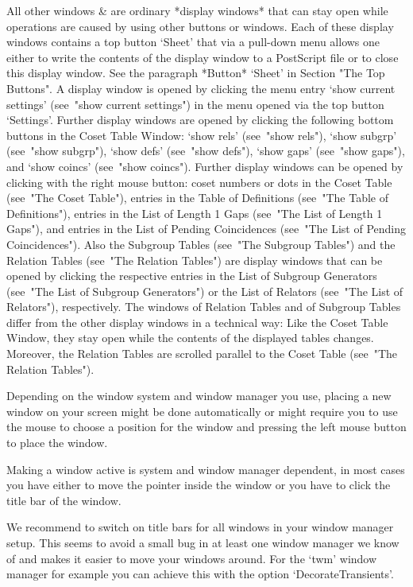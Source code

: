All other windows &
  are ordinary *display windows* that can stay open while operations
  are caused by using other buttons or windows. Each of these display
  windows contains a top button `Sheet' that via a pull-down menu
  allows one either to write the contents of the display window to a
  PostScript file or to close this display window. See the paragraph
  *Button* `Sheet' in Section "The Top Buttons".
  A display window is opened by clicking the menu entry
  `show current settings' (see~"show current settings") in the menu
  opened via the top button `Settings'. Further display windows are
  opened by clicking the following bottom buttons in the Coset Table
  Window: `show rels' (see~"show rels"), `show subgrp' (see~"show
  subgrp"), `show defs' (see~"show defs"), `show gaps' (see~"show
  gaps"), and `show coincs' (see~"show coincs").
  Further display windows can be opened by clicking with the right
  mouse button: coset numbers or dots in the Coset Table (see~"The
  Coset Table"), entries in the Table of Definitions (see~"The Table
  of Definitions"), entries in the List of Length 1 Gaps (see~"The
  List of Length 1 Gaps"), and entries in the List of Pending
  Coincidences (see~"The List of Pending Coincidences"). Also the
  Subgroup Tables (see~"The Subgroup Tables") and the Relation Tables
  (see~"The Relation Tables") are display windows that can be opened
  by clicking the respective entries in the List of Subgroup
  Generators (see~"The List of Subgroup Generators") or the List of
  Relators (see~"The List of Relators"), respectively. The windows
  of Relation Tables and of Subgroup Tables differ from the other
  display windows in a technical way: Like the Coset Table Window,
  they stay open while the contents of the displayed tables changes.
  Moreover, the Relation Tables are scrolled parallel to the Coset
  Table (see~"The Relation Tables").

\enditems

Depending on the window system and window manager you use, placing a
new window on your screen might be done automatically or might require
you to use the mouse to choose a position for the window and pressing
the left mouse button to place the window.

Making a window active is system and window manager dependent, in most
cases you have either to move the pointer inside the window or you
have to click the title bar of the window.

We recommend to switch on title bars for all windows in your window
manager setup. This seems to avoid a small bug in at least one window
manager we know of and makes it easier to move your windows
around. For the `twm' window manager for example you can achieve this
with the option `DecorateTransients'.

